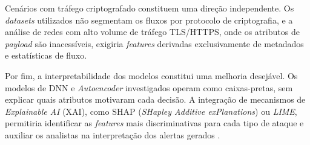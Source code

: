 Cenários com tráfego criptografado constituem uma direção independente. Os \textit{datasets} utilizados não segmentam os fluxos por protocolo de criptografia, e a análise de redes com alto volume de tráfego TLS/HTTPS, onde os atributos de \textit{payload} são inacessíveis, exigiria \textit{features} derivadas exclusivamente de metadados e estatísticas de fluxo.

Por fim, a interpretabilidade dos modelos constitui uma melhoria desejável. Os modelos de DNN e \textit{Autoencoder} investigados operam como caixas-pretas, sem explicar quais atributos motivaram cada decisão. A integração de mecanismos de \textit{Explainable AI} (XAI), como SHAP (\textit{SHapley Additive exPlanations}) ou \textit{LIME}, permitiria identificar as \textit{features} mais discriminativas para cada tipo de ataque e auxiliar os analistas na interpretação dos alertas gerados \cite{ravindran2025}.
